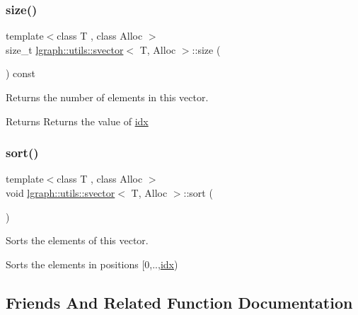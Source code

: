 \subsubsection{\texorpdfstring{size()}{size()}}
{\footnotesize\ttfamily template$<$class T , class Alloc $>$ \\
size\+\_\+t \hyperlink{classlgraph_1_1utils_1_1svector}{lgraph\+::utils\+::svector}$<$ T, Alloc $>$\+::size (\begin{DoxyParamCaption}{ }\end{DoxyParamCaption}) const}



Returns the number of elements in this vector. 

\begin{DoxyReturn}{Returns}
Returns the value of \hyperlink{classlgraph_1_1utils_1_1svector_a7ef963c079c7dc8a6a559ceef81a241f}{idx} 
\end{DoxyReturn}
\mbox{\label{classlgraph_1_1utils_1_1svector_ac2199e164429f7469decfa9d8f033069}} 
\subsubsection{\texorpdfstring{sort()}{sort()}}
{\footnotesize\ttfamily template$<$class T , class Alloc $>$ \\
void \hyperlink{classlgraph_1_1utils_1_1svector}{lgraph\+::utils\+::svector}$<$ T, Alloc $>$\+::sort (\begin{DoxyParamCaption}{ }\end{DoxyParamCaption})}



Sorts the elements of this vector. 

Sorts the elements in positions \mbox{[}0,..,\hyperlink{classlgraph_1_1utils_1_1svector_a7ef963c079c7dc8a6a559ceef81a241f}{idx}) 

\subsection{Friends And Related Function Documentation}
\mbox{\label{classlgraph_1_1utils_1_1svector_a0917cbb972bd75239a20e86164b5f7b6}} 
